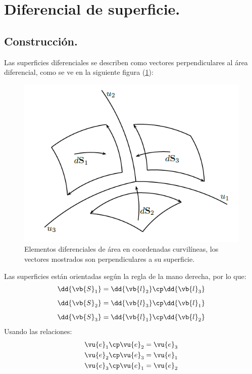\section{Diferencial de superficie.}
\subsection{Construcción.}
Las superficies diferenciales se describen como vectores perpendiculares al área diferencial, como se ve en la siguiente figura (\ref{fig:figura_diferenciales_superficie}):
\begin{figure}[H]
    \centering
    \includegraphics[scale=0.5]{Imagenes/Diferenciales_Superficie_01.png}
    \caption{Elementos diferenciales de área en coordenadas curvilíneas, los vectores mostrados son perpendiculares a su superficie.}
    \label{fig:figura_diferenciales_superficie}
\end{figure}
Las superficies están orientadas según la regla de la mano derecha, por lo que:
\begin{align*}
\dd{\vb{S}_{1}} &= \dd{\vb{l}_{2}} \cp \dd{\vb{l}_{3}} \\[0.5em] 
\dd{\vb{S}_{2}} &= \dd{\vb{l}_{3}} \cp \dd{\vb{l}_{1}} \\[0.5em]
\dd{\vb{S}_{3}} &= \dd{\vb{l}_{1}} \cp \dd{\vb{l}_{2}}
\end{align*}
Usando las relaciones:
\begin{align*}
\vu{e}_{1} \cp \vu{e}_{2} = \vu{e}_{3} \\
\vu{e}_{2} \cp \vu{e}_{3} = \vu{e}_{1} \\
\vu{e}_{3} \cp \vu{e}_{1} = \vu{e}_{2}
\end{align*}
